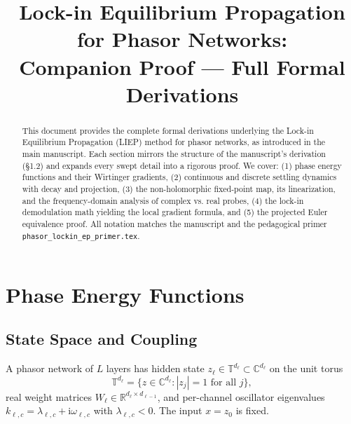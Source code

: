 \documentclass[11pt]{article}
\title{Lock-in Equilibrium Propagation for Phasor Networks:\\
Companion Proof — Full Formal Derivations}
\author{}
\date{}
\newcommand{\R}{\mathbb{R}}
\newcommand{\C}{\mathbb{C}}
\newcommand{\T}{\mathbb{T}}
\newcommand{\im}{\mathrm{i}}
\begin{document}
\maketitle

\begin{abstract}
This document provides the complete formal derivations underlying the Lock-in Equilibrium Propagation (LIEP) method for phasor networks, as introduced in the main manuscript. Each section mirrors the structure of the manuscript's derivation (§1.2) and expands every swept detail into a rigorous proof. We cover: (1) phase energy functions and their Wirtinger gradients, (2) continuous and discrete settling dynamics with decay and projection, (3) the non-holomorphic fixed-point map, its linearization, and the frequency-domain analysis of complex vs. real probes, (4) the lock-in demodulation math yielding the local gradient formula, and (5) the projected Euler equivalence proof. All notation matches the manuscript and the pedagogical primer \texttt{phasor\_lockin\_ep\_primer.tex}.
\end{abstract}


\tableofcontents

\section{Phase Energy Functions}\label{sec:phase-energy}

\subsection{State Space and Coupling}

A phasor network of $L$ layers has hidden state $z_\ell \in \T^{d_\ell} \subset \C^{d_\ell}$ on the unit torus \citep{olin2021deep,olin2023hyperdimensional}
\begin{equation}
\T^{d_\ell} = \{ z \in \C^{d_\ell} : |z_j| = 1 \text{ for all } j \},
\end{equation}
real weight matrices $W_\ell \in \R^{d_\ell \times d_{\ell-1}}$, and per-channel oscillator eigenvalues $k_{\ell,c} = \lambda_{\ell,c} + \im \omega_{\ell,c}$ with $\lambda_{\ell,c} < 0$. The input $x = z_0$ is fixed.
\end{document}
